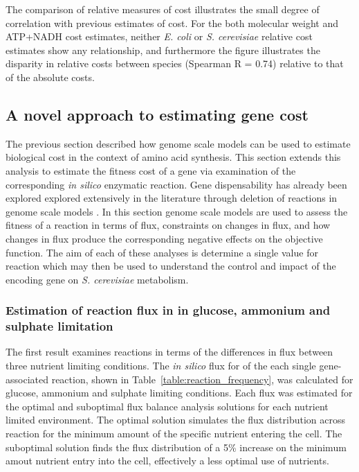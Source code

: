 The comparison of relative measures of cost illustrates the small degree of correlation with previous estimates of cost. For the both molecular weight and ATP+NADH cost estimates, neither \emph{E. coli} or \emph{S. cerevisiae} relative cost estimates show any relationship, and furthermore the figure illustrates the disparity in relative costs between species (Spearman R = 0.74) relative to that of the absolute costs.

\subsection{A novel approach to estimating gene cost}%

The previous section described how genome scale models can be used to estimate biological cost in the context of amino acid synthesis. This section extends this analysis to estimate the fitness cost of a gene via examination of the corresponding \emph{in silico} enzymatic reaction. Gene dispensability has already been explored explored extensively in the literature through deletion of reactions in genome scale models \cite{deleted_reaction_studies}. In this section genome scale models are used to assess the fitness of a reaction in terms of flux, constraints on changes in flux, and how changes in flux produce the corresponding negative effects on the objective function. The aim of each of these analyses is determine a single value for reaction which may then be used to understand the control and impact of the encoding gene on \emph{S. cerevisiae} metabolism.

\subsubsection{Estimation of reaction flux in in glucose, ammonium and sulphate limitation}%

The first result examines reactions in terms of the differences in flux between three nutrient limiting conditions. The \emph{in silico} flux for of the each single gene-associated reaction, shown in Table~\vref{table:reaction_frequency}, was calculated for glucose, ammonium and sulphate limiting conditions. Each flux was estimated for the optimal and suboptimal flux balance analysis solutions for each nutrient limited environment. The optimal solution simulates the flux distribution across reaction for the minimum amount of the specific nutrient entering the cell. The suboptimal solution finds the flux distribution of a 5\% increase on the minimum amout nutrient entry into the cell, effectively a less optimal use of nutrients.

